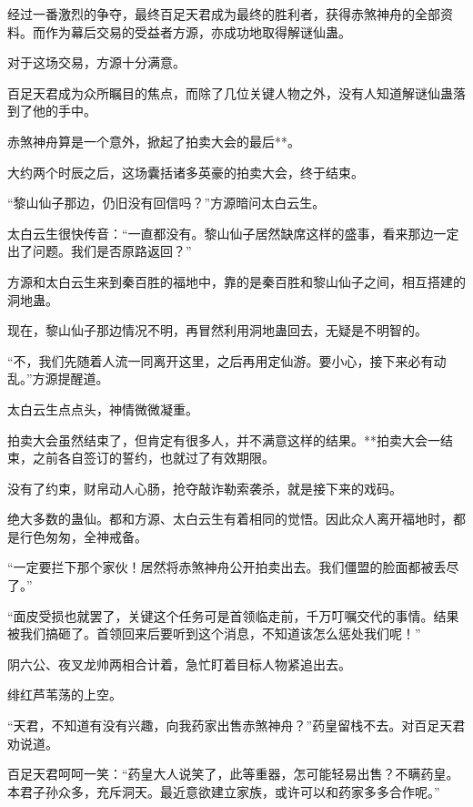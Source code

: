
\begin{this_body}

经过一番激烈的争夺，最终百足天君成为最终的胜利者，获得赤煞神舟的全部资料。而作为幕后交易的受益者方源，亦成功地取得解谜仙蛊。

对于这场交易，方源十分满意。

百足天君成为众所瞩目的焦点，而除了几位关键人物之外，没有人知道解谜仙蛊落到了他的手中。

赤煞神舟算是一个意外，掀起了拍卖大会的最后**。

大约两个时辰之后，这场囊括诸多英豪的拍卖大会，终于结束。

“黎山仙子那边，仍旧没有回信吗？”方源暗问太白云生。

太白云生很快传音：“一直都没有。黎山仙子居然缺席这样的盛事，看来那边一定出了问题。我们是否原路返回？”

方源和太白云生来到秦百胜的福地中，靠的是秦百胜和黎山仙子之间，相互搭建的洞地蛊。

现在，黎山仙子那边情况不明，再冒然利用洞地蛊回去，无疑是不明智的。

“不，我们先随着人流一同离开这里，之后再用定仙游。要小心，接下来必有动乱。”方源提醒道。

太白云生点点头，神情微微凝重。

拍卖大会虽然结束了，但肯定有很多人，并不满意这样的结果。**拍卖大会一结束，之前各自签订的誓约，也就过了有效期限。

没有了约束，财帛动人心肠，抢夺敲诈勒索袭杀，就是接下来的戏码。

绝大多数的蛊仙。都和方源、太白云生有着相同的觉悟。因此众人离开福地时，都是行色匆匆，全神戒备。

“一定要拦下那个家伙！居然将赤煞神舟公开拍卖出去。我们僵盟的脸面都被丢尽了。”

“面皮受损也就罢了，关键这个任务可是首领临走前，千万叮嘱交代的事情。结果被我们搞砸了。首领回来后要听到这个消息，不知道该怎么惩处我们呢！”

阴六公、夜叉龙帅两相合计着，急忙盯着目标人物紧追出去。

绯红芦苇荡的上空。

“天君，不知道有没有兴趣，向我药家出售赤煞神舟？”药皇留栈不去。对百足天君劝说道。

百足天君呵呵一笑：“药皇大人说笑了，此等重器，怎可能轻易出售？不瞒药皇。本君子孙众多，充斥洞天。最近意欲建立家族，或许可以和药家多多合作呢。”


\end{this_body}
